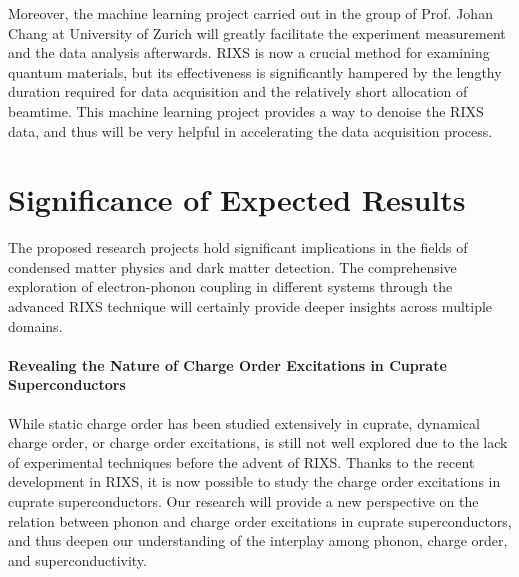 \documentclass[11pt]{article}
\begin{document}






Moreover, the machine learning project carried out in the group of Prof. Johan Chang at University of Zurich will greatly facilitate the experiment measurement and the data analysis afterwards. RIXS is now a crucial method for examining quantum materials, but its effectiveness is significantly hampered by the lengthy duration required for data acquisition and the relatively short allocation of beamtime. This machine learning project provides a way to denoise the RIXS data, and thus will be very helpful in accelerating the data acquisition process.  


\section{Significance of Expected Results}

The proposed research projects hold significant implications in the fields of condensed matter physics and dark matter detection. The comprehensive exploration of electron-phonon coupling in different systems through the advanced RIXS technique will certainly provide deeper insights across multiple domains.

\paragraph{Revealing the Nature of Charge Order Excitations in Cuprate Superconductors} While static charge order has been studied extensively in cuprate, dynamical charge order, or charge order excitations, is still not well explored due to the lack of experimental techniques before the advent of RIXS\cite{li_multiorbital_2020}. Thanks to the recent development in RIXS, it is now possible to study the charge order excitations in cuprate superconductors. Our research will provide a new perspective on the relation between phonon and charge order excitations in cuprate superconductors, and thus deepen our understanding of the interplay among phonon, charge order, and superconductivity. 
\end{document}
